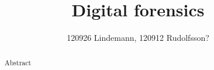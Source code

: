 

\title{Digital forensics}
\author{120926 Lindemann, 120912 Rudolfsson?}



\maketitle

\begin{abstract}
 Abstract
\end{abstract}

\thispagestyle{empty}

\clearpage
{}
\setcounter{page}{1}
\tableofcontents

\clearpage
{}








\newpage




